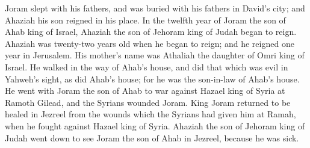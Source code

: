 {Joram slept with his fathers, and was buried with his fathers in David’s city; and Ahaziah his son reigned in his place.
In the twelfth year of Joram the son of Ahab king of Israel, Ahaziah the son of Jehoram king of Judah began to reign.
Ahaziah was twenty-two years old when he began to reign; and he reigned one year in Jerusalem. His mother’s name was Athaliah the daughter of Omri king of Israel.
He walked in the way of Ahab’s house, and did that which was evil in Yahweh’s sight, as did Ahab’s house; for he was the son-in-law of Ahab’s house.
He went with Joram the son of Ahab to war against Hazael king of Syria at Ramoth Gilead, and the Syrians wounded Joram.
King Joram returned to be healed in Jezreel from the wounds which the Syrians had given him at Ramah, when he fought against Hazael king of Syria. Ahaziah the son of Jehoram king of Judah went down to see Joram the son of Ahab in Jezreel, because he was sick.

}
